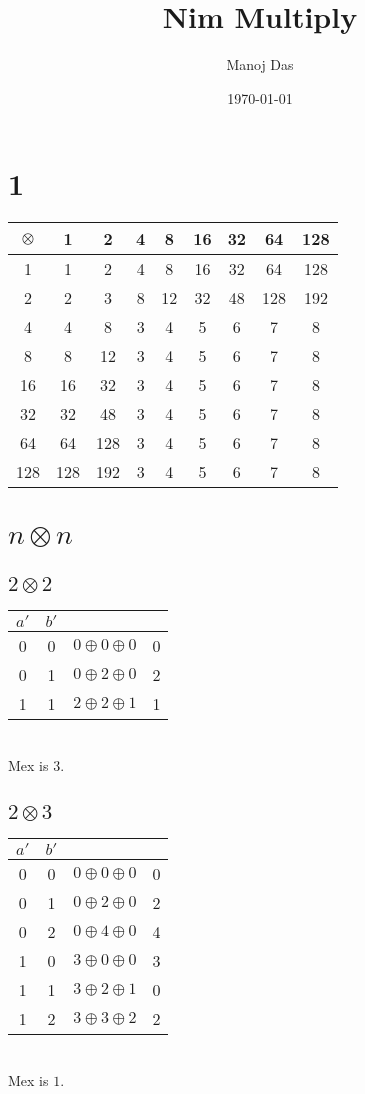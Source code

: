 \documentclass[11pt,twoside]{scrartcl}
\begin{document}
\title{Nim Multiply}

\author{Manoj Das}
\date{\today}
\section{1}
\begin{tabular}{c|cccccccc}
    $\otimes$ & 1 & 2 & 4 & 8 & 16 & 32 & 64 & 128 \\ \hline
    1 & 1 & 2&4 &8 &16 &32 &64 &128 \\ 
    2 & 2&3 &8 &12 &32 &48 &128 &192 \\ 
    4 & 4&8 &3 &4 &5 &6 &7 &8 \\ 
    8 & 8&12 &3 &4 &5 &6 &7 &8 \\ 
    16 & 16&32 &3 &4 &5 &6 &7 &8 \\ 
    32 & 32&48 &3 &4 &5 &6 &7 &8 \\ 
    64 & 64&128 &3 &4 &5 &6 &7 &8 \\ 
    128 & 128&192 &3 &4 &5 &6 &7 &8 
\end{tabular}

\section{$n \otimes n$}
\subsection{$2 \otimes 2$}
\begin{tabular}{cc|l|l}
    $a'$ & $b'$ & & \\ \hline
    0 & 0 & $0 \oplus 0 \oplus 0$ & 0 \\
    0 & 1 & $0 \oplus 2 \oplus 0$ & 2 \\
    1 & 1 & $2 \oplus 2 \oplus 1$ & 1
\end{tabular}
\ \vspace{6pt} \\ 
Mex is $3$.

\subsection{$2 \otimes 3$}
\begin{tabular}{cc|l|l}
    $a'$ & $b'$ & & \\ \hline
    0 & 0 & $0 \oplus 0 \oplus 0$ & 0 \\
    0 & 1 & $0 \oplus 2 \oplus 0$ & 2 \\
    0 & 2 & $0 \oplus 4 \oplus 0$ & 4 \\
    1 & 0 & $3 \oplus 0 \oplus 0$ & 3 \\
    1 & 1 & $3 \oplus 2 \oplus 1$ & 0 \\
    1 & 2 & $3 \oplus 3 \oplus 2$ & 2 
\end{tabular}
\ \vspace{6pt} \\ 
Mex is $1$.
\end{document}
